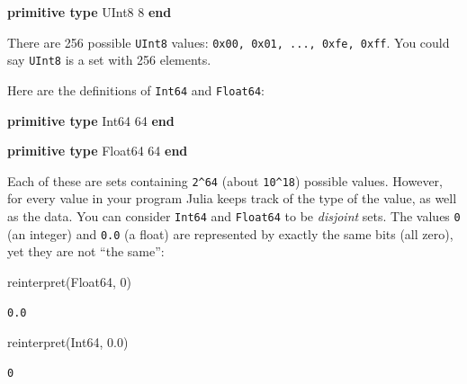 \documentclass[
]{article}
\newenvironment{Shaded}{\begin{snugshade}}{\end{snugshade}}
\newcommand{\DataTypeTok}[1]{\textcolor[rgb]{0.68,0.00,0.00}{#1}}
\newcommand{\FloatTok}[1]{\textcolor[rgb]{0.68,0.00,0.00}{#1}}
\newcommand{\FunctionTok}[1]{\textcolor[rgb]{0.28,0.35,0.67}{#1}}
\newcommand{\KeywordTok}[1]{\textcolor[rgb]{0.00,0.23,0.31}{\textbf{#1}}}
\newcommand{\NormalTok}[1]{\textcolor[rgb]{0.00,0.23,0.31}{#1}}
\begin{document}
\begin{Shaded}
\begin{Highlighting}[]
\KeywordTok{primitive type} \DataTypeTok{UInt8}
   \FloatTok{8}
\KeywordTok{end}
\end{Highlighting}
\end{Shaded}

There are 256 possible \texttt{UInt8} values:
\texttt{0x00,\ 0x01,\ ...,\ 0xfe,\ 0xff}. You could say \texttt{UInt8}
is a set with 256 elements.

Here are the definitions of \texttt{Int64} and \texttt{Float64}:

\begin{Shaded}
\begin{Highlighting}[]
\KeywordTok{primitive type} \DataTypeTok{Int64}
   \FloatTok{64}
\KeywordTok{end}

\KeywordTok{primitive type} \DataTypeTok{Float64}
   \FloatTok{64}
\KeywordTok{end}
\end{Highlighting}
\end{Shaded}

Each of these are sets containing \texttt{2\^{}64} (about
\texttt{10\^{}18}) possible values. However, for every value in your
program Julia keeps track of the type of the value, as well as the data.
You can consider \texttt{Int64} and \texttt{Float64} to be
\emph{disjoint} sets. The values \texttt{0} (an integer) and
\texttt{0.0} (a float) are represented by exactly the same bits (all
zero), yet they are not ``the same'':

\begin{Shaded}
\begin{Highlighting}[]
\FunctionTok{reinterpret}\NormalTok{(}\DataTypeTok{Float64}\NormalTok{, }\FloatTok{0}\NormalTok{)}
\end{Highlighting}
\end{Shaded}

\begin{verbatim}
0.0
\end{verbatim}

\begin{Shaded}
\begin{Highlighting}[]
\FunctionTok{reinterpret}\NormalTok{(}\DataTypeTok{Int64}\NormalTok{, }\FloatTok{0.0}\NormalTok{)}
\end{Highlighting}
\end{Shaded}

\begin{verbatim}
0
\end{verbatim}
\end{document}
